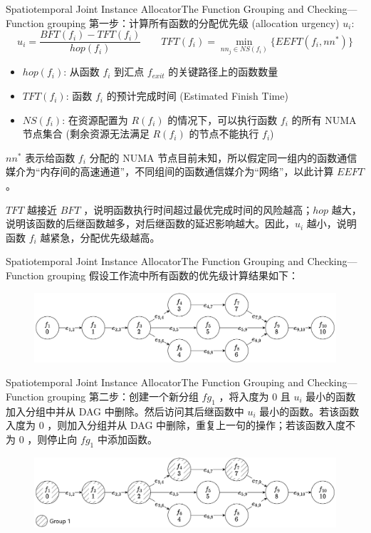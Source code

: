 \documentclass[aspectratio=169]{beamer}
\begin{document}
\begin{frame}{Spatiotemporal Joint Instance Allocator}{The Function Grouping and Checking---Function grouping}
  第一步：计算所有函数的分配优先级 (allocation urgency) $u_i$:
  \begin{equation*}
    u_i = \frac{BFT(f_i) - TFT(f_i)}{hop(f_i)} \qquad TFT(f_i) = \min_{nn_j \in NS(f_i)} \{EEFT(f_i, nn^{*})\}
  \end{equation*}
  \begin{itemize}
    \item $hop(f_i)$: 从函数 $f_i$ 到汇点 $f_{exit}$ 的关键路径上的函数数量
    \item $TFT(f_i)$: 函数 $f_i$ 的预计完成时间 (Estimated Finish Time)
    \item $NS(f_i)$: 在资源配置为 $R(f_i)$ 的情况下，可以执行函数 $f_i$ 的所有 NUMA 节点集合 (剩余资源无法满足 $R(f_i)$ 的节点不能执行 $f_i$)
  \end{itemize}

  $nn^{*}$ 表示给函数 $f_i$ 分配的 NUMA 节点目前未知，所以假定同一组内的函数通信媒介为“内存间的高速通道”，不同组间的函数通信媒介为“网络”，以此计算 $EEFT$ 。

  $TFT$ 越接近 $BFT$ ，说明函数执行时间超过最优完成时间的风险越高；$hop$ 越大，说明该函数的后继函数越多，对后继函数的延迟影响越大。因此，$u_i$ 越小，说明函数 $f_i$ 越紧急，分配优先级越高。
\end{frame}

\begin{frame}{Spatiotemporal Joint Instance Allocator}{The Function Grouping and Checking---Function grouping}
  假设工作流中所有函数的优先级计算结果如下：
  \begin{figure}
    \centering
    \includegraphics[width=\textwidth]{img/method/function-grouping-2.pdf}
  \end{figure}
\end{frame}

\begin{frame}{Spatiotemporal Joint Instance Allocator}{The Function Grouping and Checking---Function grouping}
  第二步：创建一个新分组 $fg_1$ ，将入度为 $0$ 且 $u_i$ 最小的函数加入分组中并从 DAG 中删除。然后访问其后继函数中 $u_i$ 最小的函数。若该函数入度为 $0$ ，则加入分组并从 DAG 中删除，重复上一句的操作；若该函数入度不为 $0$ ，则停止向 $fg_1$ 中添加函数。
  \begin{figure}
    \centering
    \includegraphics[width=\textwidth]{img/method/function-grouping-3.pdf}
  \end{figure}
\end{frame}
\end{document}
